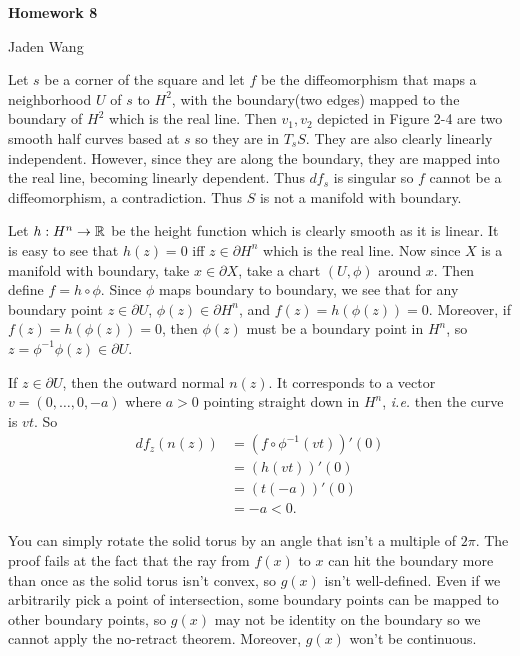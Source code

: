 \documentclass[12pt]{article}
\begin{document}
\centerline {\textsf{\textbf{\LARGE{Homework 8}}}}
\centerline {Jaden Wang}
\vspace{.15in}
\begin{problem}[2.1.3]
Let $ s$ be a corner of the square and let  $ f$ be the diffeomorphism that maps a neighborhood  $ U$ of  $ s$ to  $ H^2$, with the boundary(two edges) mapped to the boundary of $ H^2$ which is the real line. Then $ v_1, v_2$ depicted in Figure 2-4 are two smooth half curves based at $ s$ so they are in  $ T_s S$. They are also clearly linearly independent. However, since they are along the boundary, they are mapped into the real line, becoming linearly dependent. Thus  $ df_s$ is singular so $ f$ cannot be a diffeomorphism, a contradiction. Thus  $ S$ is not a manifold with boundary.
\end{problem}
\begin{problem}[2.1.10]
Let $ h: H^{n} \to \mathbb{R}$ be the height function which is clearly smooth as it is linear. It is easy to see that $ h(z) = 0$ iff $ z \in \partial H^{n}$ which is the real line. Now since $ X$ is a manifold with boundary, take  $ x \in \partial X$, take a chart $(U, \phi)$ around $ x$. Then define  $ f= h \circ \phi $. Since $ \phi$ maps boundary to boundary, we see that for any boundary point $ z \in \partial U$, $ \phi(z) \in \partial H^{n}$, and $ f(z) = h ( \phi(z)) =0$. Moreover, if $ f(z) = h(\phi(z)) = 0$, then $ \phi(z)$ must be a boundary point in $ H^{n}$, so $ z = \phi ^{-1} \phi(z) \in \partial U$.

If $ z \in \partial U$, then the outward normal $ n(z)$. It corresponds to a vector $ v=(0,\ldots,0,-a)$ where $ a >0$ pointing straight down in  $ H^{n}$, \emph{i.e.} then the curve is $ vt$. So
\begin{align*}
	df_z(n(z)) &= (f \circ \phi ^{-1} (vt))'(0) \\
	&= (h (vt))'(0) \\
	&= (t(-a))'(0) \\
	&= -a <0.
\end{align*}
\end{problem}

\begin{problem}[2.2.3]
You can simply rotate the solid torus by an angle that isn't a multiple of $ 2 \pi$. The proof fails at the fact that the ray from $ f(x)$ to $ x$ can hit the boundary more than once as the solid torus isn't convex, so $ g(x)$ isn't well-defined. Even if we arbitrarily pick a point of intersection, some boundary points can be mapped to other boundary points, so  $ g(x)$ may not be identity on the boundary so we cannot apply the no-retract theorem. Moreover, $ g(x)$ won't be continuous.
\end{problem}
\end{document}
